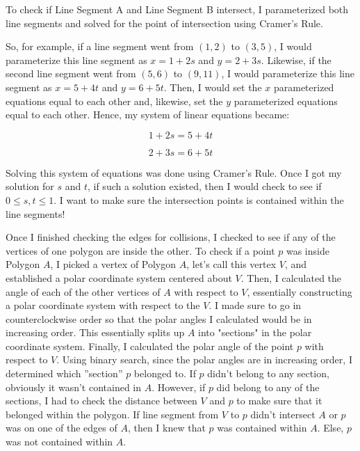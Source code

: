 \documentclass{article}
\begin{document}
To check if Line Segment A and Line Segment B intersect, I parameterized both line segments and solved for the point of intersection using Cramer's Rule. \newline 

So, for example, if a line segment went from $(1, 2)$ to $(3, 5)$, I would parameterize this line segment as $x = 1 + 2s$ and $y = 2 + 3s$. Likewise, if the second line segment went from $(5, 6)$ to $(9, 11)$, I would parameterize this line segment as $x = 5 + 4t$ and $y = 6 + 5t$. Then, I would set the $x$ parameterized equations equal to each other and, likewise, set the $y$ parameterized equations equal to each other. Hence, my system of linear equations became: \newline 

\begin{equation*}
1 + 2s = 5 + 4t
\end{equation*}

\begin{equation*}
2 + 3s = 6 + 5t
\end{equation*}

Solving this system of equations was done using Cramer's Rule. Once I got my solution for $s$ and $t$, if such a solution existed, then I would check to see if $0 \leq s, t \leq 1$. I want to make sure the intersection points is contained within the line segments! \newline 


Once I finished checking the edges for collisions, I checked to see if any of the vertices of one polygon are inside the other. To check if a point $p$ was inside Polygon $A$, I picked a vertex of Polygon $A$, let's call this vertex $V$, and established a polar coordinate system centered about $V$. Then, I calculated the angle of each of the other vertices of $A$ with respect to $V$, essentially constructing a polar coordinate system with respect to the $V$. I made sure to go in counterclockwise order so that the polar angles I calculated would be in increasing order. This essentially splits up $A$ into "sections" in the polar coordinate system. Finally, I calculated the polar angle of the point $p$ with respect to $V$. Using binary search, since the polar angles are in increasing order, I determined which ”section” $p$ belonged to. If $p$ didn’t belong to any section, obviously it wasn’t contained in $A$. However, if $p$ did belong to any of the sections, I had to check the distance between $V$ and $p$ to make sure that it belonged within the polygon. If line segment from $V$ to $p$ didn't intersect $A$ or $p$ was on one of the edges of $A$, then I knew that $p$ was contained within $A$. Else, $p$ was not contained within $A$. 
\end{document}
